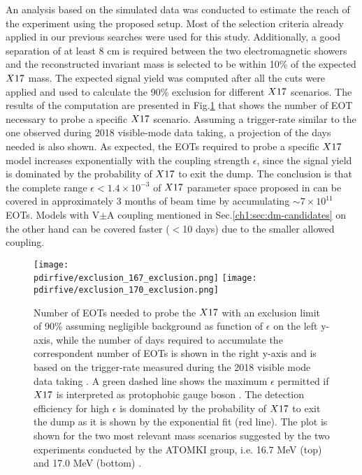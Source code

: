 An analysis based on the simulated data was conducted to estimate the reach of the experiment using the proposed setup. Most of the selection criteria already applied in our previous searches were used for this study. Additionally, a good separation of at least 8 cm is required between the two electromagnetic showers and the reconstructed invariant mass is selected to be within 10\% of the expected $X17$ mass. The expected signal yield was computed after all the cuts were applied and used to calculate the 90\% exclusion for different $X17$ scenarios. The results of the computation are presented in Fig.\ref{fig:exclusion-x17} that shows the number of EOT necessary to probe a specific $X17$ scenario. Assuming a trigger-rate similar to the one observed during 2018 visible-mode data taking, a projection of the days needed is also shown. As expected, the EOTs required to probe a specific $X17$ model increases exponentially with the coupling strength $\epsilon$, since the signal yield is dominated by the probability of $X17$ to exit the dump. The conclusion is that the complete range $\epsilon < 1.4 \times 10^{-3}$ of $X17$ parameter space proposed in \cite{PhysRevD.95.035017} can be covered in approximately 3 months of beam time by accumulating $\sim 7 \times 10^{11}$ EOTs. Models with V$\pm$A coupling mentioned in Sec.\ref{ch1:sec:dm-candidates} on the other hand can be covered faster ($<$10 days) due to the smaller allowed coupling. 

\begin{figure}[htb!]
  \centering
  \texttt{[image: \\pdirfive/exclusion\_167\_exclusion.png]}
  \texttt{[image: \\pdirfive/exclusion\_170\_exclusion.png]}
  \caption[EOT to X17 exclusion]{Number of EOTs needed to probe the $X17$ with an exclusion limit of 90\% assuming negligible background as function of $\epsilon$ on the left y-axis, while the number of days required to accumulate the correspondent number of EOTs is shown in the right y-axis and is based on the trigger-rate measured during the 2018 visible mode data taking \cite{Banerjee:2019hmi}. A green dashed line shows the maximum $\epsilon$ permitted if $X17$ is interpreted as protophobic gauge boson \cite{PhysRevD.95.035017}. The detection efficiency for high $\epsilon$ is dominated by the probability of $X17$ to exit the dump as it is shown by the exponential fit (red line). The plot is shown for the two most relevant mass scenarios suggested by the two experiments conducted by the ATOMKI group, i.e. 16.7 MeV (top) and 17.0 MeV (bottom) \cite{Krasznahorkay:2015iga,Krasznahorkay:2019lyl}.}
  \label{fig:exclusion-x17}
\end{figure}
  
